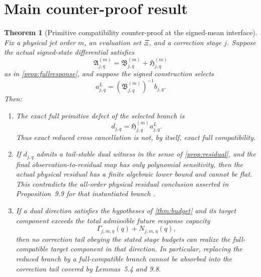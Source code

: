 \documentclass[12pt]{article}
\theoremstyle{plain}
\newtheorem{theorem}{Theorem}[section]
\theoremstyle{definition}
\theoremstyle{remark}
\newcommand{\Comp}{\mathfrak A}
\newcommand{\Red}{\mathfrak B}
\newcommand{\Hidden}{\mathfrak H}
\begin{document}
\section{Main counter-proof result}\label{sec:counterproof}
\begin{theorem}[Primitive compatibility counter-proof at the signed-mean interface]\label{thm:main}
Fix a physical jet order \(m\), an evaluation set \(\Xi\), and a correction stage \(j\). Suppose the actual signed-state differential satisfies
\[
\Comp_{j,q}^{(m)}=\Red_{j,q}^{(m)}+\Hidden_{j,q}^{(m)}
\]
as in \cref{prop:fullresponse}, and suppose the signed construction selects
\[
a^L_{j,q}=(\Red_{j,q}^{(m)})^{-1}b_{j,q}.
\]
Then:
\begin{enumerate}[label=(\alph*),leftmargin=2.2em,itemsep=0.35em]
\item The exact full primitive defect of the selected branch is
\[
\boxed{d_{j,q}=\Hidden_{j,q}^{(m)}a^L_{j,q}.}
\]
Thus exact reduced cross cancellation is not, by itself, exact full compatibility.

\item If \(d_{j,q}\) admits a tail-stable dual witness in the sense of \cref{prop:residual}, and the final observation-to-residual map has only polynomial sensitivity, then the actual physical residual has a finite algebraic lower bound and cannot be flat. This contradicts the all-order physical residual conclusion asserted in Proposition~9.9 for that instantiated branch \cite[Prop.~9.9]{OpenAI2026}.

\item If a dual direction satisfies the hypotheses of \cref{thm:budget} and its target component exceeds the total admissible future response capacity
\[
\Gamma_{j,m,\eta}(q)+N_{j,m,\eta}(q),
\]
then no correction tail obeying the stated stage budgets can realize the full-compatible target component in that direction. In particular, replacing the reduced branch by a full-compatible branch cannot be absorbed into the correction tail covered by Lemmas~5.4 and 9.8.


\end{enumerate}
\end{theorem}
\end{document}
